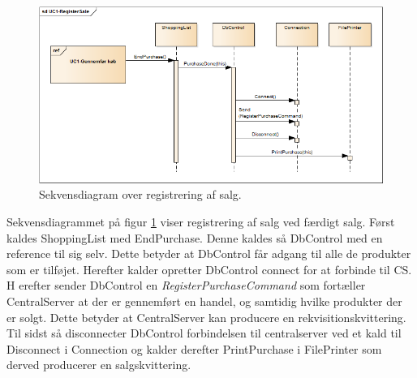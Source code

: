 \begin{figure}[H]
	\centering
	\includegraphics[width=1\textwidth]{Systemdesign/Frontend/GUI/DesignOgStruktur/Pics/RegisterSale}
	\caption{Sekvensdiagram over registrering af salg.}
	\label{fig:SekvensRegisterSale}
\end{figure}

Sekvensdiagrammet på figur \ref{fig:SekvensRegisterSale} viser registrering af salg ved færdigt salg. Først kaldes ShoppingList med EndPurchase. Denne kaldes så DbControl med en reference til sig selv. Dette betyder at DbControl får adgang til alle de produkter som er tilføjet. Herefter kalder opretter DbControl connect for at forbinde til \gls{CS}. H	erefter sender DbControl en \textit{RegisterPurchaseCommand} som fortæller CentralServer at der er gennemført en handel, og samtidig hvilke produkter der er solgt. Dette betyder at CentralServer kan producere en rekvisitionskvittering. Til sidst så disconnecter DbControl forbindelsen til centralserver ved et kald til Disconnect i Connection og kalder derefter PrintPurchase i FilePrinter som derved producerer en salgskvittering.

